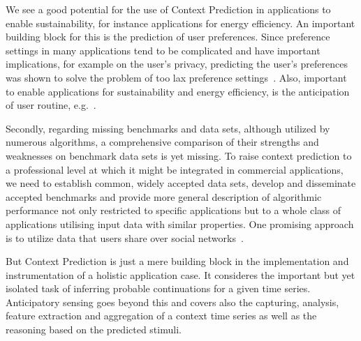 We see a good potential for the use of Context Prediction in applications to enable sustainability, for instance applications for energy efficiency. 
An important building block for this is the prediction of user preferences. 
Since preference settings in many applications tend to be complicated and have important implications, for example on the user's privacy, predicting the user's preferences was shown to solve the problem of too lax preference settings~\cite{Prediction_Bigwood_2012}. 
Also, important to enable applications for sustainability and energy efficiency, is the anticipation of user routine, e.g.~\cite{Prediction_Seiter_2012}.    

Secondly, regarding missing benchmarks and data sets, although utilized by numerous algorithms, a comprehensive comparison of their strengths and weaknesses on benchmark data sets is yet missing. 
To raise context prediction to a professional level at which it might be integrated in commercial applications, we need to establish common, widely accepted data sets, develop and disseminate accepted benchmarks and provide more general description of algorithmic performance not only restricted to specific applications but to a whole class of applications utilising input data with similar properties. 
One promising approach is to utilize data that users share over social networks~\cite{Prediction_Zhang_2012}.

But Context Prediction is just a mere building block in the implementation and instrumentation of a holistic application case. 
It consideres the important but yet isolated task of inferring probable continuations for a given time series. 
Anticipatory sensing goes beyond this and covers also the capturing, analysis, feature extraction and aggregation of a context time series as well as the reasoning based on the predicted stimuli. 